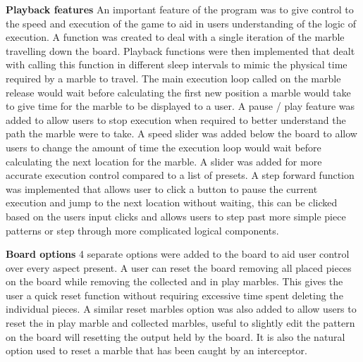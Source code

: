 \documentclass{l4proj}
\begin{document}
\textbf{Playback features}
An important feature of the program was to give control to the speed and execution of the game to aid in users understanding of the logic of execution. A function was created to deal with a single iteration of the marble travelling down the board. Playback functions were then implemented that dealt with calling this function in different sleep intervals to mimic the physical time required by a marble to travel. The main execution loop called on the marble release would wait before calculating the first new position a marble would take to give time for the marble to be displayed to a user. A pause / play feature was added to allow users to stop execution when required to better understand the path the marble were to take. A speed slider was added below the board to allow users to change the amount of time the execution loop would wait before calculating the next location for the marble. A slider was added for more accurate execution control compared to a list of presets. A step forward function was implemented that allows user to click a button to pause the current execution and jump to the next location without waiting, this can be clicked based on the users input clicks and allows users to step past more simple piece patterns or step through more complicated logical components. 

\textbf{Board options}
4 separate options were added to the board to aid user control over every aspect present. A user can reset the board removing all placed pieces on the board while removing the collected and in play marbles. This gives the user a quick reset function without requiring excessive time spent deleting the individual pieces. A similar reset marbles option was also added to allow users to reset the in play marble and collected marbles, useful to slightly edit the pattern on the board will resetting the output held by the board. It is also the natural option used to reset a marble that has been caught by an interceptor.
\end{document}
